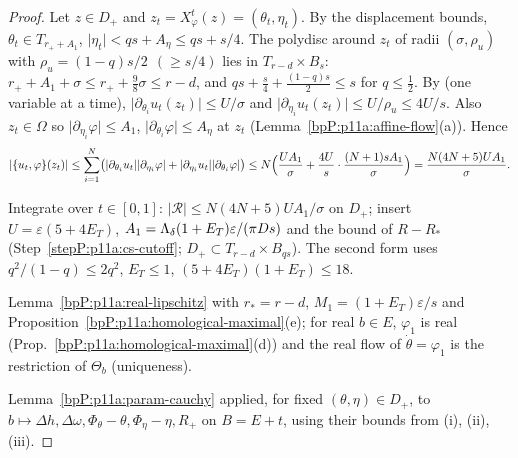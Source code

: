 \begin{proof}
\label{stepP:p11a:cs-bracket} Let $z\in D_+$ and $z_t=X^t_\varphi(z)=(\theta_t,\eta_t)$. By the displacement bounds, $\theta_t\in T_{r_++A_1}$, $\lvert\eta_t\rvert<qs+A_\eta\le qs+s/4$. The polydisc around $z_t$ of radii $(\sigma,\rho_u)$ with $\rho_u=(1-q)s/2\ \ (\ge s/4)$ lies in $T_{r-d}\times B_s$: $r_++A_1+\sigma\le r_++\frac98\sigma\le r-d$, and $qs+\frac s4+\frac{(1-q)s}2\le s$ for $q\le\frac12$. By  (one variable at a time), $\lvert\partial_{\theta_i}u_t(z_t)\rvert\le U/\sigma$ and $\lvert\partial_{\eta_i}u_t(z_t)\rvert\le U/\rho_u\le4U/s$. Also $z_t\in\Omega$ so $\lvert\partial_{\eta_i}\varphi\rvert\le A_1$, $\lvert\partial_{\theta_i}\varphi\rvert\le A_\eta$ at $z_t$ (Lemma~\ref{bpP:p11a:affine-flow}(a)). Hence
\[\lvert\{u_t,\varphi\}(z_t)\rvert\le\sum_{i=1}^N\bigl(\lvert\partial_{\theta_i}u_t\rvert\lvert\partial_{\eta_i}\varphi\rvert+\lvert\partial_{\eta_i}u_t\rvert\lvert\partial_{\theta_i}\varphi\rvert\bigr)\le N\Bigl(\frac{UA_1}\sigma+\frac{4U}s\cdot\frac{(N+1)sA_1}\sigma\Bigr)=\frac{N(4N+5)UA_1}\sigma.\]

\label{stepP:p11a:cs-assemble} Integrate over $t\in[0,1]$: $\lvert\mathcal R\rvert\le N(4N+5)UA_1/\sigma$ on $D_+$; insert $U=\varepsilon(5+4E_T)$, $A_1=\Lambda_{\delta}(1+E_T)\varepsilon/(\pi Ds)$ and the bound of $R-R_*$ (Step~\ref{stepP:p11a:cs-cutoff}; $D_+\subset T_{r-d}\times B_{qs}$). The second form uses $q^2/(1-q)\le2q^2$, $E_T\le1$, $(5+4E_T)(1+E_T)\le18$.

\label{stepP:p11a:cs-lip} Lemma~\ref{bpP:p11a:real-lipschitz} with $r_*=r-d$, $M_1=(1+E_T)\varepsilon/s$ and Proposition~\ref{bpP:p11a:homological-maximal}(e); for real $b\in E$, $\varphi_1$ is real (Prop.~\ref{bpP:p11a:homological-maximal}(d)) and the real flow of $\dot\theta=\varphi_1$ is the restriction of $\Theta_b$ (uniqueness).

\label{stepP:p11a:cs-param} Lemma~\ref{bpP:p11a:param-cauchy} applied, for fixed $(\theta,\eta)\in D_+$, to $b\mapsto\Delta h,\Delta\omega,\Phi_\theta-\theta,\Phi_\eta-\eta,R_+$ on $B=E+t$, using their bounds from (i), (ii), (iii).
\end{proof}

